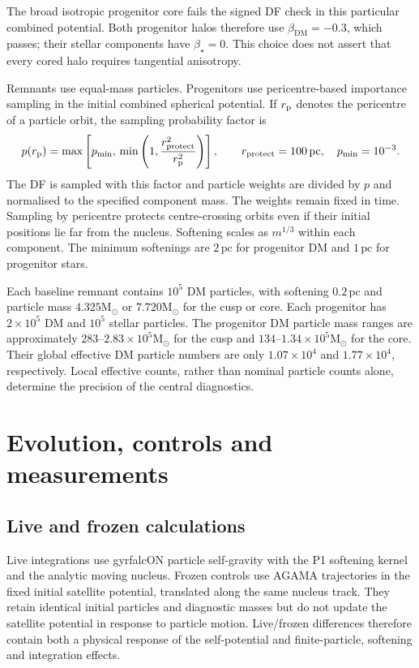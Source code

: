 \documentclass[11pt,a4paper]{article}
\newcommand{\Msun}{\mathrm{M}_{\odot}}
\newcommand{\DM}{\mathrm{DM}}
\newcommand{\pc}{\,\mathrm{pc}}
\begin{document}
The broad isotropic progenitor core fails the signed DF check in this
particular combined potential. Both progenitor halos therefore use
$\beta_{\DM}=-0.3$, which passes; their stellar components have $\beta_\star=0$.
This choice does not assert that every cored halo requires tangential anisotropy.

Remnants use equal-mass particles. Progenitors use pericentre-based importance
sampling in the initial combined spherical potential. If $r_{\rm p}$ denotes
the pericentre of a particle orbit, the sampling probability factor is
\begin{equation}
 p(r_{\rm p})=\max\left[p_{\min},\,
       \min\left(1,\frac{r_{\rm protect}^2}{r_{\rm p}^2}\right)\right],
 \qquad r_{\rm protect}=100\pc,\quad p_{\min}=10^{-3}.
 \label{eq:sampling}
\end{equation}
The DF is sampled with this factor and particle weights are divided by $p$
and normalised to the specified component mass. The weights remain fixed in
time. Sampling by pericentre protects centre-crossing orbits even if their
initial positions lie far from the nucleus. Softening scales as $m^{1/3}$
within each component. The minimum softenings are $2\pc$ for progenitor DM
and $1\pc$ for progenitor stars.

Each baseline remnant contains $10^5$ DM particles, with softening
$0.2\pc$ and particle mass $4.325\Msun$ or $7.720\Msun$ for the cusp or core.
Each progenitor has $2\times10^5$ DM and $10^5$ stellar particles.
The progenitor DM particle mass ranges are approximately
$283$--$2.83\times10^5\Msun$ for the cusp and
$134$--$1.34\times10^5\Msun$ for the core. Their global effective DM particle
numbers are only $1.07\times10^4$ and $1.77\times10^4$, respectively.
Local effective counts, rather than nominal particle counts alone, determine
the precision of the central diagnostics.

\section{Evolution, controls and measurements}

\subsection{Live and frozen calculations}

Live integrations use gyrfalcON particle self-gravity with the P1 softening
kernel and the analytic moving nucleus. Frozen controls use AGAMA trajectories
in the fixed initial satellite potential, translated along the same nucleus
track. They retain identical initial particles and diagnostic masses but do
not update the satellite potential in response to particle motion. Live/frozen
differences therefore contain both a physical response of the self-potential
and finite-particle, softening and integration effects.
\end{document}
